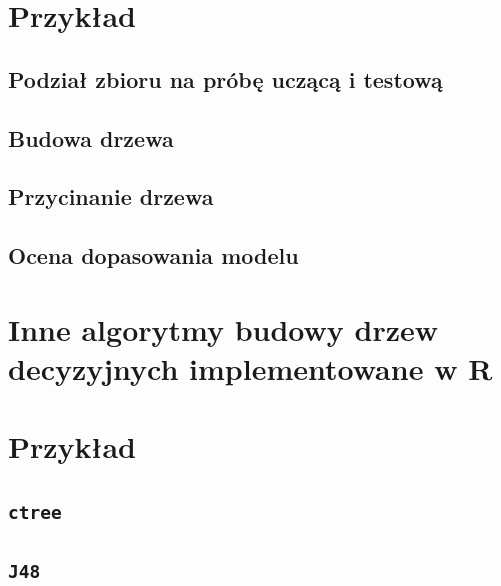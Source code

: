 \documentclass[]{book}
\theoremstyle{plain}
\theoremstyle{definition}
\begin{document}
\hypertarget{przyk41}{%
\section{Przykład}\label{przyk41}}

\hypertarget{podzia-zbioru-na-probe-uczaca-i-testowa}{%
\subsection{Podział zbioru na próbę uczącą i testową}\label{podzia-zbioru-na-probe-uczaca-i-testowa}}

\hypertarget{budowa-drzewa}{%
\subsection{Budowa drzewa}\label{budowa-drzewa}}

\hypertarget{przycinanie-drzewa}{%
\subsection{Przycinanie drzewa}\label{przycinanie-drzewa}}

\hypertarget{ocena-dopasowania-modelu}{%
\subsection{Ocena dopasowania modelu}\label{ocena-dopasowania-modelu}}

\hypertarget{inne-algorytmy-budowy-drzew-decyzyjnych-implementowane-w-r}{%
\section{\texorpdfstring{Inne algorytmy budowy drzew decyzyjnych implementowane w \textbf{R}}{Inne algorytmy budowy drzew decyzyjnych implementowane w R}}\label{inne-algorytmy-budowy-drzew-decyzyjnych-implementowane-w-r}}

\hypertarget{przyk42}{%
\section{Przykład}\label{przyk42}}

\hypertarget{ctree}{%
\subsection{\texorpdfstring{\texttt{ctree}}{ctree}}\label{ctree}}

\hypertarget{j48}{%
\subsection{\texorpdfstring{\texttt{J48}}{J48}}\label{j48}}
\end{document}
